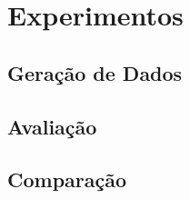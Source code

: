 \chapter{Experimentos}
\label{ch:experimentos}

%
\section{Geração de Dados}
\label{sec:geracaodados}

\section{Avaliação}
\label{sec:avaliacao}

\section{Comparação}
\label{sec:comparacao}
